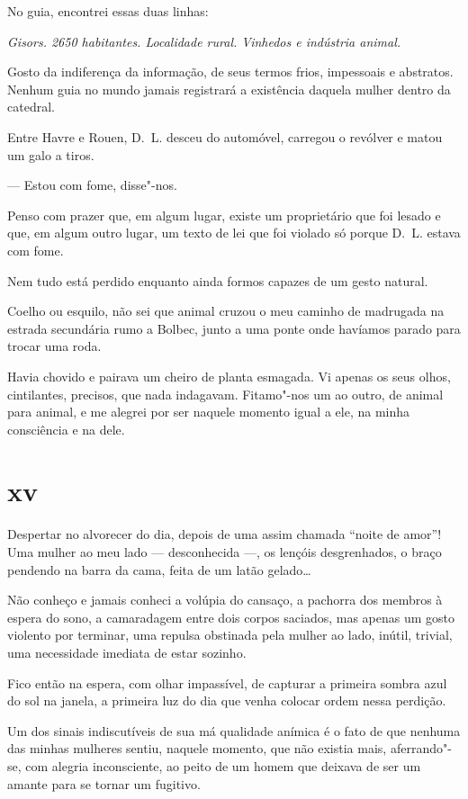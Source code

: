 No guia, encontrei essas duas linhas:

\emph{Gisors. 2650 habitantes. Localidade rural. Vinhedos e indústria
animal.}

Gosto da indiferença da informação, de seus termos frios, impessoais e
abstratos. Nenhum guia no mundo jamais registrará a existência daquela
mulher dentro da catedral.

\asterisc

Entre Havre e Rouen, D.~L. desceu do automóvel, carregou o revólver e
matou um galo a tiros.

--- Estou com fome, disse"-nos.

Penso com prazer que, em algum lugar, existe um proprietário que foi
lesado e que, em algum outro lugar, um texto de lei que foi violado só
porque D.~L. estava com fome.

Nem tudo está perdido enquanto ainda formos capazes de um gesto natural.

\asterisc

Coelho ou esquilo, não sei que animal cruzou o meu caminho de
madrugada na estrada secundária rumo a Bolbec, junto a uma ponte onde
havíamos parado para trocar uma roda.

Havia chovido e pairava um cheiro de planta esmagada. Vi apenas os seus
olhos, cintilantes, precisos, que nada indagavam. Fitamo"-nos um ao
outro, de animal para animal, e me alegrei por ser naquele momento
igual a ele, na minha consciência e na dele.

\section{xv}

Despertar no alvorecer do dia, depois de uma assim chamada ``noite de
amor''! Uma mulher ao meu lado --- desconhecida ---, os lençóis
desgrenhados, o braço pendendo na barra da cama, feita de um latão
gelado\ldots{}

Não conheço e jamais conheci a volúpia do cansaço, a pachorra dos
membros à espera do sono, a camaradagem entre dois corpos saciados, mas
apenas um gosto violento por terminar, uma repulsa obstinada pela mulher
ao lado, inútil, trivial, uma necessidade imediata de estar sozinho.

Fico então na espera, com olhar impassível, de capturar a primeira
sombra azul do sol na janela, a primeira luz do dia que venha colocar
ordem nessa perdição.

Um dos sinais indiscutíveis de sua má qualidade anímica é o fato de que
nenhuma das minhas mulheres sentiu, naquele momento, que não existia
mais, aferrando"-se, com alegria inconsciente, ao peito de um homem que
deixava de ser um amante para se tornar um fugitivo.

